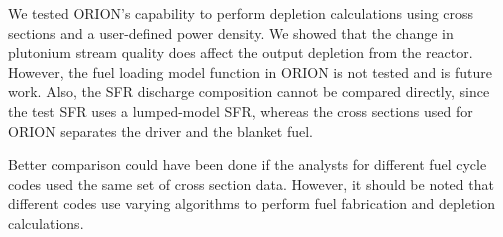 \documentclass{article}
\begin{document}
We tested ORION's capability to perform depletion calculations
using cross sections and a user-defined power density. We showed that
the change in plutonium stream quality does affect the output depletion
from the reactor. However, the fuel loading model function in ORION is not tested
and is future work. Also, the \gls{SFR} discharge composition cannot be
compared directly, since the test \gls{SFR} uses a lumped-model \gls{SFR},
whereas the cross sections used for ORION separates the driver and the blanket fuel.

Better comparison could have been done if the analysts for different fuel cycle
codes used the same set of cross section data. However, it should be noted that
different codes use varying algorithms to perform fuel fabrication and depletion
calculations.




\end{document}
